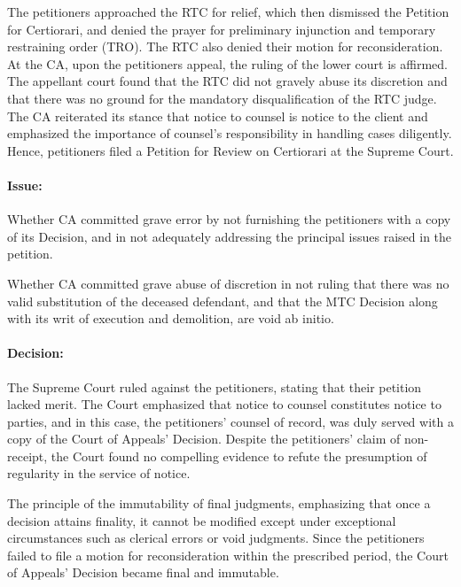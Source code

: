 \documentclass[
12pt,
oneside,
onehalfspacing,
headsepline
]{DigestCollection}
\begin{document}
The petitioners approached the RTC for relief, which then dismissed the Petition for Certiorari, and denied the prayer for preliminary injunction and temporary restraining order (TRO). The RTC also denied their motion for reconsideration. At the CA, upon the petitioners appeal, the ruling of the lower court is affirmed. The appellant court found that the RTC did not gravely abuse its discretion and that there was no ground for the mandatory disqualification of the RTC judge. The CA reiterated its stance that notice to counsel is notice to the client and emphasized the importance of counsel's responsibility in handling cases diligently. Hence, petitioners filed a Petition for Review on Certiorari at the Supreme Court.

\paragraph{Issue:}
\label{54ba3750-1248-11ef-aa24-9916ea601717}


Whether CA committed grave error by not furnishing the petitioners with a copy of its Decision, and in not adequately addressing the principal issues raised in the petition.

Whether CA committed grave abuse of discretion in not ruling that there was no valid substitution of the deceased defendant, and that the MTC Decision along with its writ of execution and demolition, are void ab initio.

\paragraph{Decision:}
\label{521c8200-1248-11ef-aa24-9916ea601717}


The Supreme Court ruled against the petitioners, stating that their petition lacked merit. The Court emphasized that notice to counsel constitutes notice to parties, and in this case, the petitioners' counsel of record, was duly served with a copy of the Court of Appeals' Decision. Despite the petitioners' claim of non-receipt, the Court found no compelling evidence to refute the presumption of regularity in the service of notice.

The principle of the immutability of final judgments, emphasizing that once a decision attains finality, it cannot be modified except under exceptional circumstances such as clerical errors or void judgments. Since the petitioners failed to file a motion for reconsideration within the prescribed period, the Court of Appeals' Decision became final and immutable.
\end{document}
